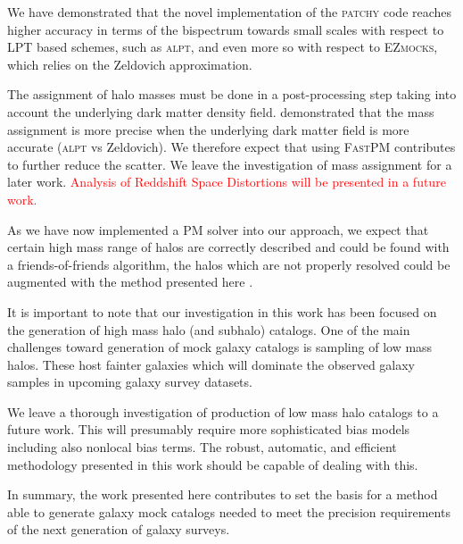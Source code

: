 \documentclass[english,usenatbib]{mn2e}
\newcommand{\tod}[1]{{\textcolor{red}{ #1}}}
\begin{document}
We have demonstrated that the novel implementation of the \textsc{patchy} code reaches higher accuracy in terms of the bispectrum towards small scales with respect to  LPT based schemes, such as \textsc{alpt}, and even more so with respect to \textsc{EZmocks}, which relies on the Zeldovich approximation. 

The assignment of halo masses must be done in a post-processing step taking into account the underlying dark matter density field. \citet{zhao2015} demonstrated that the mass assignment is more precise when the underlying dark matter field is more accurate (\textsc{alpt} vs Zeldovich). We therefore expect that using \textsc{FastPM} contributes to further reduce the scatter. We leave the investigation of mass assignment for a later work. \tod{Analysis of Reddshift Space Distortions will be presented in a future work.}


As we have now implemented a PM solver into our approach, we expect that certain high mass range of halos are correctly described and could be found with a friends-of-friends algorithm, the halos which are not properly resolved could be augmented with the method presented here  \citep[see methods to extend the resolution of $N$-body simulations,][]{delatorre,angulo2014,ahn2015}.  

It is important to note that our investigation in this work has been focused on the generation of high mass halo (and subhalo) catalogs. One of the main challenges toward generation of mock galaxy catalogs is sampling of low mass halos. These host fainter galaxies which will dominate the observed galaxy samples in upcoming galaxy survey datasets. 

We leave a thorough investigation of production of low mass halo catalogs to a future work. This will presumably require more sophisticated bias models including also nonlocal bias terms. The robust, automatic, and efficient methodology presented in this work should be capable of dealing with this.


In summary, the work presented here contributes to set the basis for a method able to generate galaxy mock catalogs needed to meet the precision requirements of the next generation of galaxy surveys. 
\end{document}
